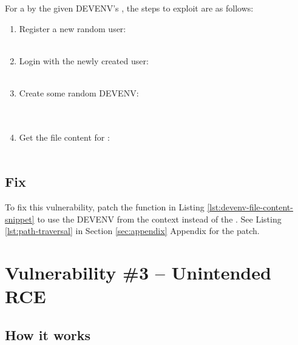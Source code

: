 \documentclass[10pt]{article}
\begin{document}
For a by the  given DEVENV's , the steps to exploit are as follows:
\begin{enumerate}
	\item Register a new random user: \\
	       \\
	\item Login with the newly created user: \\
	       \\
	\item Create some random DEVENV: \\
	       \\
	       \\
	\item Get the file content for : \\
	       \\
\end{enumerate}

\subsection{Fix}

To fix this vulnerability, patch the  function in Listing \ref{lst:devenv-file-content-snippet} to use the DEVENV from the context instead of the . See Listing \ref{lst:path-traversal} in Section \ref{sec:appendix} Appendix for the patch.

\section{Vulnerability \#3 -- Unintended RCE}

\subsection{How it works}
\end{document}
